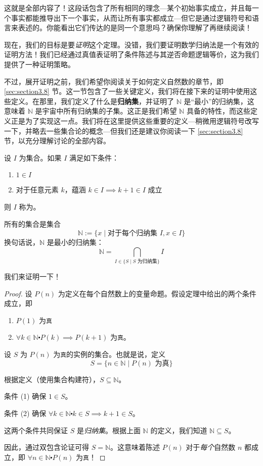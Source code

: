 这就是全部内容了！这段话包含了所有相同的理念---某个初始事实成立，并且每一个事实都能推导出下一个事实，从而让所有事实都成立---但它是通过逻辑符号和语言来表述的。你能看出它们传达的是同一个意思吗？确保你理解了再继续阅读！

现在，我们的目标是要\emph{证明}这个定理。没错，我们要证明数学归纳法是一个有效的证明方法！我们已经通过真值表证明了条件陈述与其逆否命题逻辑等价，这为我们提供了一种证明策略。

不过，展开证明之前，我们希望你阅读关于如何定义自然数的章节，即 \ref{sec:section3.8} 节。这一节包含了一些关键定义，我们将在接下来的证明中使用这些定义。在那里，我们定义了什么是\textbf{归纳集}，并证明了 $\mathbb{N}$ 是``最小''的归纳集，这意味着 $\mathbb{N}$ 是宇宙中所有归纳集的子集。这正是我们希望 $\mathbb{N}$ 具备的特性，而这些定义正是为了实现这一点。我们将在这里提供这些重要的定义---稍微用逻辑符号改写一下，并略去一些集合论的概念---但我们还是建议你阅读一下 \ref{sec:section3.8} 节，以充分理解讨论的全部内容。

\begin{definition}
    设 $I$ 为集合。如果 $I$ 满足如下条件：
    \begin{enumerate}
        \item $1 \in I$
        \item 对于任意元素 $k$，蕴涵 $k \in I \implies k + 1 \in I$ 成立
    \end{enumerate}
    则 $I$ 称为。
\end{definition}

\begin{definition}
    所有的集合是集合
    \[\mathbb{N}:=\{x \mid \text{对于每个归纳集 }I, x \in I\}\]
    换句话说，$\mathbb{N}$ 是最小的归纳集：
    \[\mathbb{N} = \bigcap_{I \in \{S \mid S \text{ 为归纳集}\}} I\] 
\end{definition}

我们来证明一下！

\begin{proof}
    设 $P(n)$ 为定义在每个自然数上的变量命题。假设定理中给出的两个条件成立，即
    \begin{enumerate}[label=(\arabic*)]
        \item $P(1)$ 为\verb|真|
        \item $\forall k \in \mathbb{N} \centerdot P(k) \implies P(k+1)$ 为\verb|真|。
    \end{enumerate}

    设 $S$ 为 $P(n)$ 为\verb|真|的实例的集合。也就是说，定义
    \[S = \{n \in \mathbb{N} \mid P(n) \text{ 为真}\}\]

    根据定义（使用集合构建符），$S \subseteq \mathbb{N}$。

    条件 (1) 确保 $1 \in S$。

    条件 (2) 确保 $\forall k \in \mathbb{N} \centerdot k \in S \implies k+1 \in S$。

    这两个条件共同保证 $S$ 是\emph{归纳集}。根据上面 $\mathbb{N}$ 的定义，我们知道 $\mathbb{N} \subseteq S$。

    因此，通过双包含论证可得 $S = \mathbb{N}$。这意味着陈述 $P(n)$ 对于\emph{每个}自然数 $n$ 都成立，即 $\forall n \in \mathbb{N} \centerdot P(n)$ 为\verb|真|！
\end{proof}

